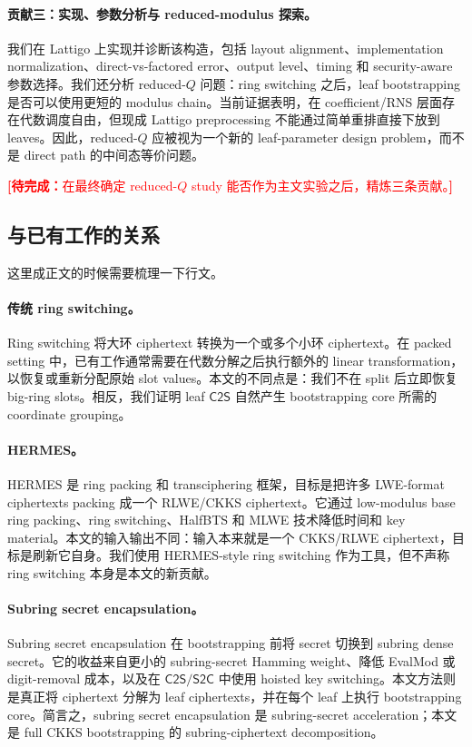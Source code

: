\documentclass[UTF8,11pt]{article}
\newcommand{\todo}[1]{\textcolor{red}{\textbf{[待完成：}#1\textbf{]}}}
\newcommand{\CtwoS}{\mathsf{C2S}}
\newcommand{\StwoC}{\mathsf{S2C}}
\theoremstyle{definition}
\theoremstyle{plain}
\begin{document}
\paragraph{贡献三：实现、参数分析与 reduced-modulus 探索。} 我们在 Lattigo 上实现并诊断该构造，包括 layout alignment、implementation normalization、direct-vs-factored error、output level、timing 和 security-aware 参数选择。我们还分析 reduced-$Q$ 问题：ring switching 之后，leaf bootstrapping 是否可以使用更短的 modulus chain。当前证据表明，在 coefficient/RNS 层面存在代数调度自由，但现成 Lattigo preprocessing 不能通过简单重排直接下放到 leaves。因此，reduced-$Q$ 应被视为一个新的 leaf-parameter design problem，而不是 direct path 的中间态等价问题。

\todo{在最终确定 reduced-$Q$ study 能否作为主文实验之后，精炼三条贡献。}

\subsection{与已有工作的关系}

这里成正文的时候需要梳理一下行文。


\paragraph{传统 ring switching。} Ring switching 将大环 ciphertext 转换为一个或多个小环 ciphertext。在 packed setting 中，已有工作通常需要在代数分解之后执行额外的 linear transformation，以恢复或重新分配原始 slot values。本文的不同点是：我们不在 split 后立即恢复 big-ring slots。相反，我们证明 leaf $\CtwoS$ 自然产生 bootstrapping core 所需的 coordinate grouping。

\paragraph{HERMES。} HERMES 是 ring packing 和 transciphering 框架，目标是把许多 LWE-format ciphertexts packing 成一个 RLWE/CKKS ciphertext。它通过 low-modulus base ring packing、ring switching、HalfBTS 和 MLWE 技术降低时间和 key material。本文的输入输出不同：输入本来就是一个 CKKS/RLWE ciphertext，目标是刷新它自身。我们使用 HERMES-style ring switching 作为工具，但不声称 ring switching 本身是本文的新贡献。

\paragraph{Subring secret encapsulation。} Subring secret encapsulation 在 bootstrapping 前将 secret 切换到 subring dense secret。它的收益来自更小的 subring-secret Hamming weight、降低 EvalMod 或 digit-removal 成本，以及在 $\CtwoS/\StwoC$ 中使用 hoisted key switching。本文方法则是真正将 ciphertext 分解为 leaf ciphertexts，并在每个 leaf 上执行 bootstrapping core。简言之，subring secret encapsulation 是 subring-secret acceleration；本文是 full CKKS bootstrapping 的 subring-ciphertext decomposition。
\end{document}
